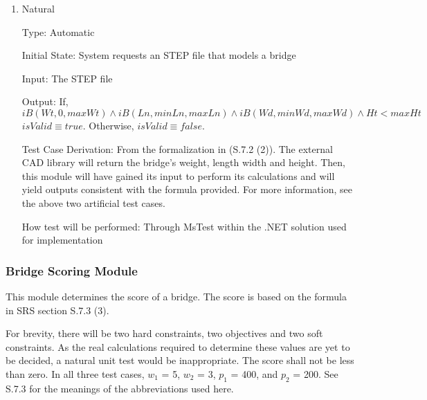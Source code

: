 \documentclass[12pt, titlepage]{article}
\begin{document}
\begin{enumerate}
How test will be performed: Through MsTest within the .NET solution used for implementation
					
\item{Natural}

Type: Automatic
					
Initial State: System requests an STEP file that models a bridge
					
Input: The STEP file
					
Output: If,
\[iB(Wt, 0, maxWt) \land iB(Ln, minLn, maxLn) \land iB(Wd, minWd, maxWd) \land Ht < maxHt \]
$isValid \equiv true$. Otherwise, $isValid \equiv false$.

Test Case Derivation: From the formalization in (S.7.2 (2)). The external CAD library will return
the bridge's weight, length width and height. Then, this module will have gained its input to perform its calculations
and will yield outputs consistent with the formula provided. For more information, see the above two artificial test cases. 

How test will be performed: Through MsTest within the .NET solution used for implementation
    
\end{enumerate}

\subsubsection{Bridge Scoring Module}



This module determines the score of a bridge. The score is based on the formula in SRS section S.7.3 (3).

For brevity, there will be two hard constraints, two objectives and two soft constraints. As the real calculations required
to determine these values are yet to be decided, a natural unit test would be inappropriate. The score shall not be less
than zero. In all three test cases, $w_1$ = 5, $w_2$ = 3, $p_1$ = 400, and $p_2$ = 200. See S.7.3 for the meanings of
the abbreviations used here.
\end{document}
